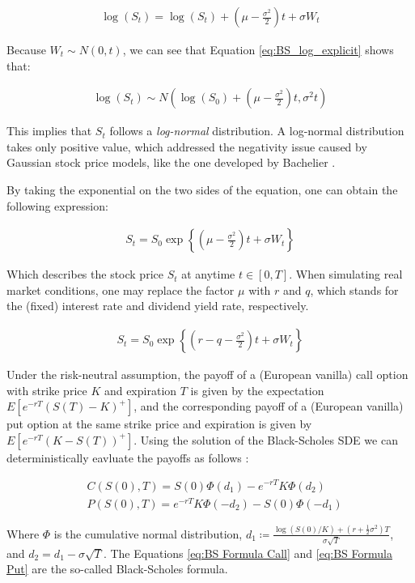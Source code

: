 \begin{align} \label{eq:BS_log_explicit}
\log(S_t) = \log(S_t) + (\mu - \frac{\sigma^2}{2})t + \sigma W_t
\end{align}

Because $W_t\sim N(0, t)$, we can see that Equation \ref{eq:BS_log_explicit} shows that:

\begin{align*}
\log(S_t)\sim N(\log(S_0)+(\mu - \frac{\sigma^2}{2})t, \sigma^2 t)
\end{align*}

This implies that $S_t$ follows a \textit{log-normal} distribution. A log-normal distribution takes only positive value, which addressed the negativity issue caused by Gaussian stock price models, like the one developed by Bachelier \cite{Bachelier1900}.

By taking the exponential on the two sides of the equation, one can obtain the following expression:

\begin{align} \label{eq:BS_explicit}
S_t = S_0\exp{\left\{(\mu-\frac{\sigma^2}{2})t + \sigma W_t\right\}}
\end{align}

Which describes the stock price $S_t$ at anytime $t\in[0,T]$. When simulating real market conditions, one may replace the factor $\mu$ with $r$ and $q$, which stands for the (fixed) interest rate and dividend yield rate, respectively.

\begin{align*}
S_t = S_0\exp{\left\{(r-q-\frac{\sigma^2}{2})t + \sigma W_t\right\}}
\end{align*}

Under the risk-neutral assumption, the payoff of a (European vanilla) call option with strike price $K$ and expiration $T$ is given by the expectation $E[e^{-rT}(S(T)-K)^+]$, and the corresponding payoff of a (European vanilla) put option at the same strike price and expiration is given by $E[e^{-rT}(K-S(T))^+]$. Using the solution of the Black-Scholes SDE we can deterministically eavluate the payoffs as follows \cite{Higham2004}:

\begin{align*}
&C(S(0), T) = S(0)\Phi(d_1) - e^{-rT}K\Phi(d_2) \\ 
&P(S(0), T) = e^{-rT}K\Phi(-d_2) - S(0)\Phi(-d_1)
\end{align*}

Where $\Phi$ is the cumulative normal distribution, $d_1 \coloneqq \frac{\log(S(0)/K)+(r+\frac{1}{2}\sigma^2)T}{\sigma\sqrt{T}}$, and $d_2 = d_1 - \sigma\sqrt{T}$. The Equations \ref{eq:BS Formula Call} and \ref{eq:BS Formula Put} are the so-called Black-Scholes formula.


